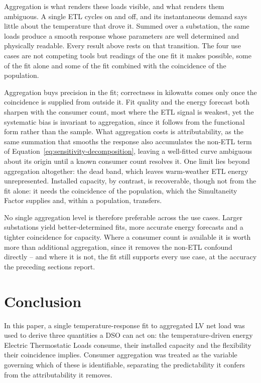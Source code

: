 \documentclass[9pt,journal,a4]{IEEEtran}
\begin{document}
Aggregation is what renders these loads visible, and what renders them ambiguous. A single ETL cycles on and off, and its instantaneous demand says little about the temperature that drove it. Summed over a substation, the same loads produce a smooth response whose parameters are well determined and physically readable. Every result above rests on that transition. The four use cases are not competing tools but readings of the one fit it makes possible, some of the fit alone and some of the fit combined with the coincidence of the population.

Aggregation buys precision in the fit; correctness in kilowatts comes only once the coincidence is supplied from outside it. Fit quality and the energy forecast both sharpen with the consumer count, most where the ETL signal is weakest, yet the systematic bias is invariant to aggregation, since it follows from the functional form rather than the sample. What aggregation costs is attributability, as the same summation that smooths the response also accumulates the non-ETL term of Equation~\eqref{eq:sensitivity-decomposition}, leaving a well-fitted curve ambiguous about its origin until a known consumer count resolves it. One limit lies beyond aggregation altogether: the dead band, which leaves warm-weather ETL energy unrepresented. Installed capacity, by contrast, is recoverable, though not from the fit alone: it needs the coincidence of the population, which the Simultaneity Factor supplies and, within a population, transfers.

No single aggregation level is therefore preferable across the use cases. Larger substations yield better-determined fits, more accurate energy forecasts and a tighter coincidence for capacity. Where a consumer count is available it is worth more than additional aggregation, since it removes the non-ETL confound directly -- and where it is not, the fit still supports every use case, at the accuracy the preceding sections report.


\section{Conclusion}
\label{section:conclusion}

In this paper, a single temperature-response fit to aggregated LV net load was used to derive three quantities a DSO can act on: the temperature-driven energy Electric Thermostatic Loads consume, their installed capacity and the flexibility their coincidence implies. Consumer aggregation was treated as the variable governing which of these is identifiable, separating the predictability it confers from the attributability it removes.
\end{document}
